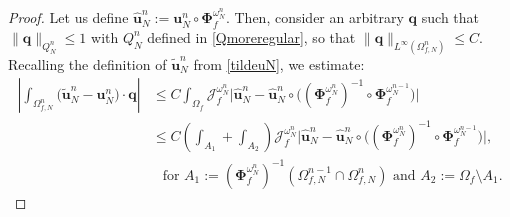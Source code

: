 \documentclass[11pt]{article}
\newcommand{\bd}{\boldsymbol}
\theoremstyle{definition}
\begin{document}
\begin{proof}
Let us define $\hat{\bd{u}}^{n}_{N} := \bd{u}^{n}_{N} \circ \bd{\Phi}^{\omega^{n}_{N}}_{f}$. Then, consider an arbitrary $\bd{q}$ such that $\|\bd{q}\|_{Q^{n}_{N}} \le 1$ with $Q^{n}_{N}$ defined in \eqref{Qmoreregular}, so that $\|\bd{q}\|_{L^{\infty}(\Omega^{n}_{f, N})} \le C$. Recalling the definition of $\tilde{\bd{u}}^{n}_{N}$ from \eqref{tildeuN}, we estimate:
\begin{align*}
\left|\int_{\Omega^{n}_{f, N}} \Big(\tilde{\bd{u}}^{n}_{N} - \bd{u}^{n}_{N}\Big) \cdot \bd{q}\right| &\le C \int_{\Omega_{f}} \mathcal{J}^{\omega^{n}_{N}}_{f} \Big|\hat{\bd{u}}^{n}_{N} - \hat{\bd{u}}^{n}_{N} \circ \Big((\bd{\Phi}^{\omega^{n}_{N}}_{f})^{-1} \circ \bd{\Phi}^{\omega^{n - 1}_{N}}_{f}\Big)\Big| \\
&\le C \left (\int_{A_{1}} + \int_{A_{2}}\right ) \mathcal{J}^{\omega^{n}_{N}}_{f} \Big|\hat{\bd{u}}^{n}_{N} - \hat{\bd{u}}^{n}_{N} \circ \Big((\bd{\Phi}^{\omega^{n}_{N}}_{f})^{-1} \circ \bd{\Phi}^{\omega^{n - 1}_{N}}_{f}\Big)\Big|, \\
&\ \ \text{ for } A_{1} := (\bd{\Phi}^{\omega^{n}_{N}}_{f})^{-1} (\Omega^{n - 1}_{f, N} \cap \Omega^{n}_{f, N}) \text{ and } A_{2} := \Omega_{f} \setminus A_{1}.
\end{align*}

\medskip


\end{proof}
\end{document}
